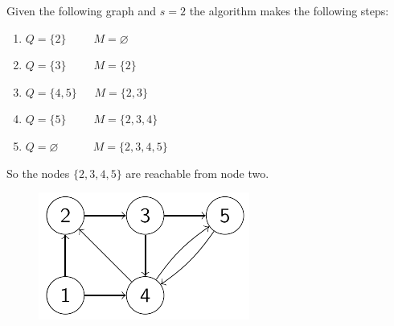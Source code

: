 \documentclass[12pt, a4paper]{report}
\newtheorem[style=M,bodystyle=\normalfont]{theorem}{Theorem}
\newtheorem[style=M,bodystyle=\normalfont]{corollary}{Corollary}
\newtheorem[style=M,bodystyle=\normalfont]{lemma}{Lemma}
\newtheorem[style=M,bodystyle=\normalfont]{definition}{Definition}
\begin{document}
    \begin{example}
        Given the following graph and $s=2$ the algorithm makes the following steps: 
        \begin{enumerate}
            \item $Q=\{2\} \:\:\:\:\:\:\:\:\:\:\: M=\varnothing$
            \item $Q=\{3\} \:\:\:\:\:\:\:\:\:\:\: M=\{2\}$
            \item $Q=\{4,5\} \:\:\:\:\:\:\: M=\{2,3\}$
            \item $Q=\{5\} \:\:\:\:\:\:\:\:\:\:\: M=\{2,3,4\}$
            \item $Q=\varnothing \:\:\:\:\:\:\:\:\:\:\:\:\:\: M=\{2,3,4,5\}$
        \end{enumerate}
        So the nodes $\{2,3,4,5\}$ are reachable from node two. 
        \begin{figure}[H]
            \centering
            \includegraphics[width=0.3\linewidth]{images/graphs.png}
        \end{figure}
    \end{example}
\end{document}
